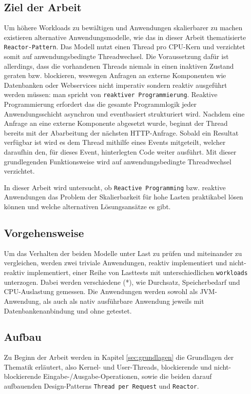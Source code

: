 \subsection{Ziel der Arbeit}
\label{subsec:ziel}
Um höhere Workloads zu bewältigen und Anwendungen skalierbarer zu machen existieren alternative
Anwendungsmodelle, wie das in dieser Arbeit thematisierte \verb|Reactor-Pattern|.
Das Modell nutzt einen Thread pro CPU-Kern und verzichtet somit auf anwendungsbedingte Threadwechsel.
Die Voraussetzung dafür ist allerdings, dass die vorhandenen Threads niemals in einen inaktiven Zustand geraten bzw. blockieren,
weswegen Anfragen an externe Komponenten wie Datenbanken oder Webservices nicht imperativ sondern reaktiv ausgeführt werden
müssen: man spricht von \verb|reaktiver Programmierung|. Reaktive Programmierung erfordert das die gesamte Programmlogik jeder
Anwendungsschicht asynchron und eventbasiert strukturiert wird.
Nachdem eine Anfrage an eine externe Komponente abgesetzt wurde, beginnt der Thread bereits mit der Abarbeitung der nächsten
HTTP-Anfrage. Sobald ein Resultat verfügbar ist wird es dem Thread mithilfe eines Events mitgeteilt, welcher daraufhin
den, für dieses Event, hinterlegten Code weiter ausführt. Mit dieser grundlegenden Funktionsweise wird auf anwendungsbedingte
Threadwechsel verzichtet.

In dieser Arbeit wird untersucht, ob \verb|Reactive Programming| bzw. reaktive Anwendungen das Problem der Skalierbarkeit
für hohe Lasten praktikabel lösen können und welche alternativen Lösungsansätze es gibt.

\subsection{Vorgehensweise}
\label{subsec:vorgehensweise}
Um das Verhalten der beiden Modelle unter Last zu prüfen und miteinander zu vergleichen, werden zwei triviale Anwendungen,
reaktiv implementiert und nicht-reaktiv implementiert, einer Reihe von Lasttests mit unterschiedlichen \verb|workloads| unterzogen.
Dabei werden verschiedene (*), wie Durchsatz, Speicherbedarf und CPU-Auslastung gemessen.
Die Anwendungen werden sowohl als JVM-Anwendung, als auch als nativ ausführbare Anwendung jeweils mit Datenbankenanbindung und
ohne getestet.

\subsection{Aufbau}
\label{subsec:aufbau}
Zu Beginn der Arbeit werden in Kapitel \ref{sec:grundlagen} die Grundlagen der Thematik erläutert, also Kernel- und User-Threads,
blockierende und nicht-blockierende Eingabe-/Ausgabe-Operationen, sowie die beiden darauf aufbauenden Design-Patterns
\verb|Thread per Request| und \verb|Reactor|.

